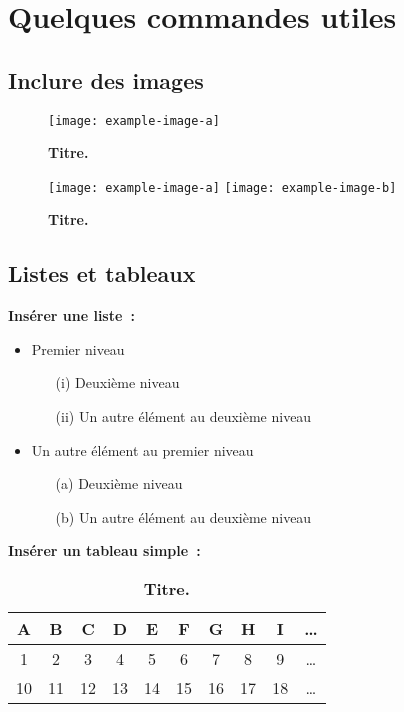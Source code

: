 \chapter{Quelques commandes utiles}\label{chap2}

\section{Inclure des images}

\begin{figure}[ht!]
    \centering
    \texttt{[image: example-image-a]}
    \caption{\textbf{Titre.} \lipsum[1][1-5]}
    \label{fig:image1}
\end{figure}

\begin{figure}[ht!]
    \centering
    \texttt{[image: example-image-a]}
    \texttt{[image: example-image-b]}
    \caption{\textbf{Titre.} \lipsum[1][1-5]}
    \label{fig:image2}
\end{figure}



\section{Listes et tableaux}

\textbf{Insérer une liste~:}
\begin{itemize}
    \item Premier niveau
    \begin{itemize}
        \item[(i)] Deuxième niveau
        \item[(ii)] Un autre élément au deuxième niveau
    \end{itemize}
    \item Un autre élément au premier niveau
        \begin{itemize}
        \item[(a)] Deuxième niveau
        \item[(b)] Un autre élément au deuxième niveau
    \end{itemize}
\end{itemize}
\bigskip

\textbf{Insérer un tableau simple~:} 
\begin{table}[H]
    \centering
    \begin{tabular}{|c|c|c|c|c|c|c|c|c|c|}
        \hline
        A & B & C & D & E & F & G & H & I & \dots \\
        \hline
        1 & 2 & 3 & 4 & 5 & 6 & 7 & 8 & 9 & \dots\\
        10 & 11 & 12 & 13 & 14 & 15 & 16 & 17 & 18 & \dots \\
        \hline
    \end{tabular}
    \caption{\textbf{Titre.} \lipsum[1][1-3]}
    \label{tab:table-label}
\end{table}

